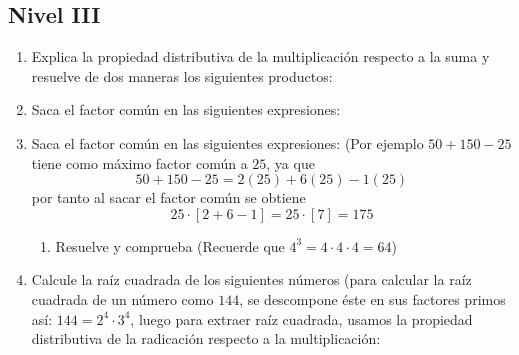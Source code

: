\documentclass[twoside]{article}
\begin{document}
\subsection*{Nivel III}
\begin{enumerate}
\item Explica la propiedad distributiva de la multiplicación respecto a la suma y resuelve de dos maneras los siguientes productos:
\begin{enumerate}
\end{enumerate}
\item Saca el factor común en las siguientes expresiones:
\begin{enumerate}
\end{enumerate}
\item Saca el factor común en las siguientes expresiones: (Por ejemplo $50+150-25$ tiene como máximo factor común a $25$, ya que \[50+150-25=2(25)+6(25)-1(25)\] por tanto al sacar el factor común se obtiene \[25\cdot[2+6-1]=25\cdot [7]=175\]
\begin{enumerate}
\end{enumerate}
\begin{enumerate}
\item Resuelve y comprueba (Recuerde que $4^{3}=4\cdot 4\cdot 4=64$)
\end{enumerate}
\item Calcule la raíz cuadrada de los siguientes números (para calcular la raíz cuadrada de un número como $144$, se descompone éste en sus factores primos así: $144=2^{4}\cdot 3^{4}$, luego para extraer raíz cuadrada, usamos la propiedad distributiva de la radicación respecto a la multiplicación:

\end{enumerate}
\end{document}

